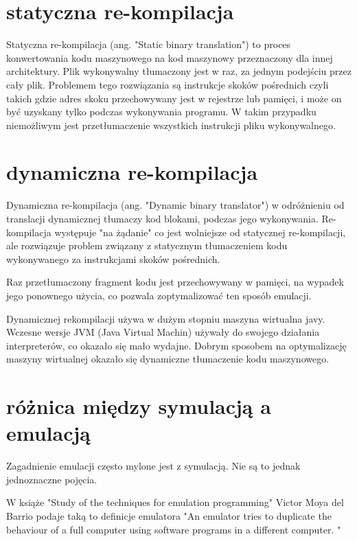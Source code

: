 	\section{statyczna re-kompilacja}
	Statyczna re-kompilacja (ang. "Static binary translation") to proces konwertowania kodu maszynowego na kod maszynowy przeznaczony dla innej architektury. Plik wykonywalny tłumaczony jest w raz, za jednym podejściu przez cały plik. 	 Problemem tego rozwiązania są instrukcje skoków pośrednich czyli takich gdzie adres skoku przechowywany jest w rejestrze lub pamięci, i może on być uzyskany tylko podczas wykonywania programu. W takim przypadku niemożliwym jest przetłumaczenie wszystkich instrukcji pliku wykonywalnego. 
	\cite{uqbt}
	
	\section{dynamiczna re-kompilacja}
	Dynamiczna re-kompilacja (ang. "Dynamic binary translator") w odróżnieniu od translacji dynamicznej tłumaczy kod blokami, podczas jego wykonywania. Re-kompilacja występuje "na żądanie" co jest wolniejsze od statycznej re-kompilacji, ale rozwiązuje problem związany z statycznym tłumaczeniem kodu wykonywanego za instrukcjami skoków pośrednich.
	
	Raz przetłumaczony fragment kodu jest przechowywany w pamięci, na wypadek jego ponownego użycia, co pozwala zoptymalizować ten sposób emulacji.
	\cite{uqbt}
	
	Dynamicznej rekompilacji używa w dużym stopniu maszyna wirtualna javy. Wczesne wersje JVM (Java Virtual Machin) używały do swojego działania interpreterów, co okazało się mało wydajne. Dobrym sposobem na optymalizację maszyny wirtualnej okazało się dynamiczne tłumaczenie kodu maszynowego. 
	\cite{dynamicRecompilationInJava}
	
	
	\section{różnica między symulacją a emulacją} 
	Zagadnienie emulacji często mylone jest z symulacją. Nie są to jednak jednoznaczne pojęcia.
	
	W książe "Study of the techniques for emulation
	programming" Victor Moya del Barrio podaje taką to definicje emulatora "An emulator tries to duplicate the behaviour of a full computer using software programs in a different computer. "\cite{studyofthetechniquesforemulationprogramming}